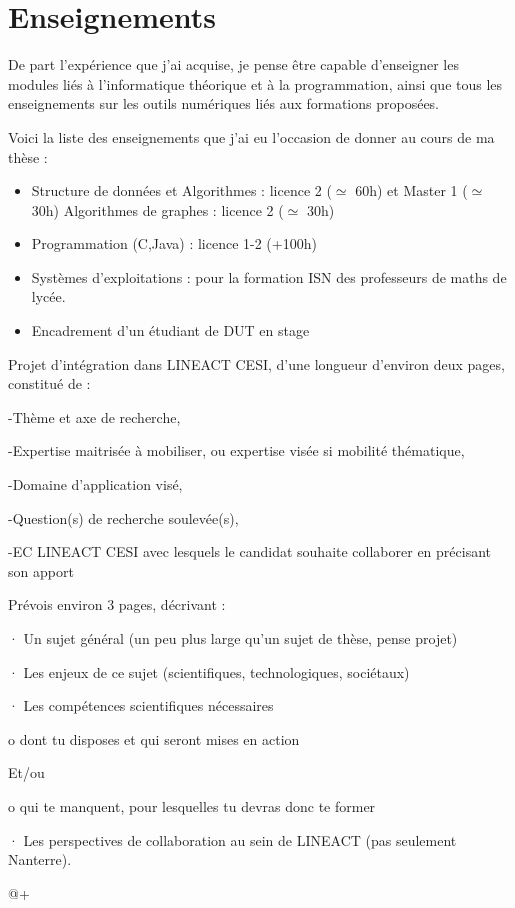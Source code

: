 \documentclass[a4paper,10pt]{article}
\begin{document}
\section{Enseignements}
De part l'expérience que j'ai acquise, je pense être capable d'enseigner les modules liés à l'informatique théorique et à la programmation, ainsi que tous les enseignements sur les outils numériques liés aux formations proposées.

Voici la liste des enseignements que j'ai eu l'occasion de donner au cours de ma thèse :
\begin{itemize}
\item Structure de données et Algorithmes : licence 2 ($\simeq$ 60h) et Master 1 ($\simeq$ 30h) Algorithmes de graphes : licence 2 ($\simeq$ 30h)
\item Programmation (C,Java) : licence 1-2 (+100h)
\item Systèmes d’exploitations : pour la formation ISN des professeurs de maths de lycée.
\item Encadrement d’un étudiant de DUT en stage
\end{itemize}


    Projet d’intégration dans LINEACT CESI, d’une longueur d’environ deux pages, constitué de :

               -Thème et axe de recherche,

               -Expertise maitrisée à mobiliser, ou expertise visée si mobilité thématique,

               -Domaine d’application visé,

               -Question(s) de recherche soulevée(s),

               -EC LINEACT CESI avec lesquels le candidat souhaite collaborer en précisant son apport  
               
               
               Prévois environ 3 pages, décrivant :

·         Un sujet général (un peu plus large qu’un sujet de thèse, pense projet)

·         Les enjeux de ce sujet (scientifiques, technologiques, sociétaux)

·         Les compétences scientifiques nécessaires

o   dont tu disposes et qui seront mises en action

Et/ou

o   qui te manquent, pour lesquelles tu devras donc te former

·         Les perspectives de collaboration au sein de LINEACT (pas seulement Nanterre).

 

@+
\end{document}
